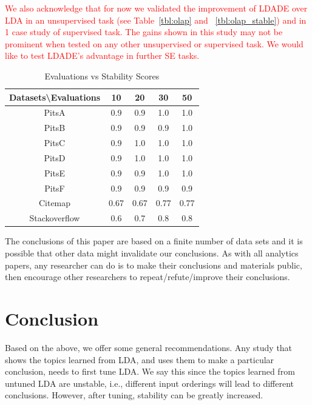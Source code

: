 \documentclass[twocolumn,5p,sort&compress]{elsarticle}
\theoremstyle{break}
\begin{document}
\noindent
\textcolor{red}{We also acknowledge that for now we validated the improvement of LDADE over LDA in an unsupervised task (see Table~\ref{tbl:olap} and ~\ref{tbl:olap_stable}) and in 1 case study of supervised task. The gains shown in this study may not be prominent when tested on any other unsupervised or supervised task. We would like to test LDADE's advantage in further SE tasks.}

\begin{table}[!htbp]
\scriptsize
\begin{center}
\caption{Evaluations vs Stability Scores}
\label{tb:tablename1}
\begin{tabular}{|c|c|c|c|c|}
\hline 
\textbf{Datasets\textbackslash Evaluations} & \textbf{10} & \textbf{20} & \textbf{30} &
\textbf{50} \\[0.5ex]
\hline
PitsA & 0.9 & 0.9 & 1.0 & 1.0\\ 
\hline
PitsB & 0.9 & 0.9 & 0.9 & 1.0 \\
\hline
PitsC & 0.9 & 1.0 & 1.0 & 1.0\\ 
\hline
PitsD & 0.9 & 1.0 & 1.0 & 1.0\\ 
\hline
PitsE & 0.9 & 0.9 & 1.0 & 1.0\\
\hline
PitsF & 0.9 & 0.9 & 0.9 & 0.9\\
\hline
Citemap & 0.67 & 0.67 & 0.77 & 0.77\\
\hline
Stackoverflow & 0.6 & 0.7 & 0.8 & 0.8\\
\hline
\end{tabular}
\end{center}
\end{table}

The conclusions of this paper are based on a finite number of data sets and it is possible
that other data might invalidate our conclusions. As with all analytics papers, any researcher can do is to make their conclusions and materials public, then encourage
other researchers to repeat/refute/improve their conclusions.

\section{Conclusion}

Based on the above, we offer some general recommendations. Any study that shows the topics learned from LDA, and uses them to make a particular
conclusion, needs to first tune LDA. We say this since the topics learned from untuned LDA are unstable, i.e., different input orderings will lead to different conclusions. However, after tuning, stability can be greatly increased.
\end{document}
